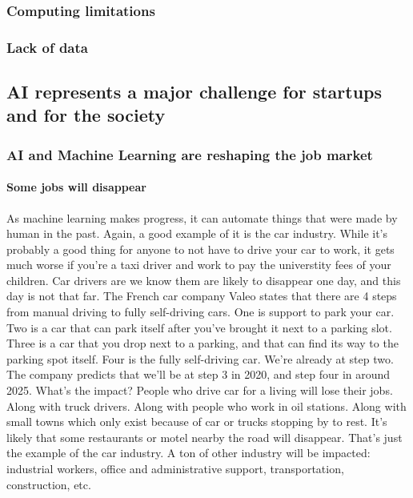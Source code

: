 \documentclass[12pt]{article}
\begin{document}
\subsubsection{Computing limitations}

\subsubsection{Lack of data}

\subsection{AI represents a major challenge for startups and for the society}

\subsubsection{AI and Machine Learning are reshaping the job market}

\paragraph{Some jobs will disappear}

As machine learning makes progress, it can automate things that were made by
human in the past. Again, a good example of it is the car industry. While it's
probably a good thing for anyone to not have to drive your car to work, it gets
much worse if you're a taxi driver and work to pay the universtity fees of your
children. Car drivers are we know them are likely to disappear one day, and this
day is not that far. The French car company Valeo states that there are 4 steps
from manual driving to fully self-driving cars. One is support to park your car.
Two is a car that can park itself after you've brought it next to a parking
slot. Three is a car that you drop next to a parking, and that can find its way
to the parking spot itself. Four is the fully self-driving car. We're already at
step two. The company predicts that we'll be at step 3 in 2020, and step four in
around 2025. What's the impact? People who drive car for a living will lose
their jobs. Along with truck drivers. Along with people who work in oil
stations. Along with small towns which only exist because of car or trucks
stopping by to rest. It's likely that some restaurants or motel nearby the road
will disappear. That's just the example of the car industry. A ton of other
industry will be impacted: industrial workers, office and administrative
support, transportation, construction, etc.
\end{document}
